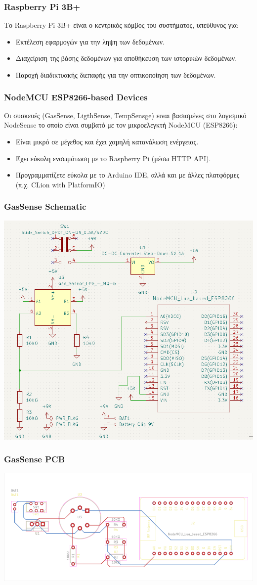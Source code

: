 \documentclass{beamer}
\begin{document}
\begin{frame}
\frametitle{Raspberry Pi 3B+}
Το Raspberry Pi 3B+ είναι ο κεντρικός κόμβος του συστήματος, υπεύθυνος για:
\begin{itemize}
    \item Εκτέλεση εφαρμογών για την ληψη των δεδομένων.
    \item Διαχείριση της βάσης δεδομένων για αποθήκευση των ιστορικών δεδομένων.
    \item Παροχή διαδικτυακής διεπαφής για την οπτικοποίηση των δεδομένων.
\end{itemize}
\end{frame}

\begin{frame}
\frametitle{NodeMCU ESP8266-based Devices}
Οι συσκευές (GasSense, LigthSense, TempSensge) ειναι βασισμένες στο λογισμικό NodeSense το οποίο είναι συμβατό με τον μικροελεγκτή NodeMCU (ESP8266):
\begin{itemize}
    \item Είναι μικρό σε μέγεθος και έχει χαμηλή κατανάλωση ενέργειας.
    \item Έχει εύκολη ενσωμάτωση με το Raspberry Pi (μέσω HTTP API).
    \item Προγραμματίζετε εύκολα με το Arduino IDE, αλλά και με άλλες πλατφόρμες (π.χ. CLion with PlatformIO)
\end{itemize}
\end{frame}

\begin{frame}
\frametitle{GasSense Schematic}
	\centerline{\includegraphics[height=0.6\textwidth]{assets/gassense-schematic}}
\end{frame}
\begin{frame}
\frametitle{GasSense PCB}
	\colorbox{PineGreen}{\centerline{\includegraphics[height=0.4\textwidth]{assets/GasSense-brd}}}
\end{frame}
\end{document}
